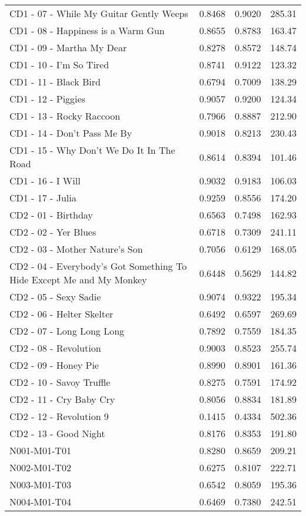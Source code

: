 \begin{longtable}[c]{|l|c|l|l|}
CD1 - 07 - While My Guitar Gently Weeps & 0.8468 & 0.9020 & 285.31 \\
CD1 - 08 - Happiness is a Warm Gun & 0.8655 & 0.8783 & 163.47 \\
CD1 - 09 - Martha My Dear & 0.8278 & 0.8572 & 148.74 \\
CD1 - 10 - I'm So Tired & 0.8741 & 0.9122 & 123.32 \\
CD1 - 11 - Black Bird & 0.6794 & 0.7009 & 138.29 \\
CD1 - 12 - Piggies & 0.9057 & 0.9200 & 124.34 \\
CD1 - 13 - Rocky Raccoon & 0.7966 & 0.8887 & 212.90 \\
CD1 - 14 - Don't Pass Me By & 0.9018 & 0.8213 & 230.43 \\
CD1 - 15 - Why Don't We Do It In The Road & 0.8614 & 0.8394 & 101.46 \\
CD1 - 16 - I Will & 0.9032 & 0.9183 & 106.03 \\
CD1 - 17 - Julia & 0.9259 & 0.8556 & 174.20 \\
CD2 - 01 - Birthday & 0.6563 & 0.7498 & 162.93 \\
CD2 - 02 - Yer Blues & 0.6718 & 0.7309 & 241.11 \\
CD2 - 03 - Mother Nature's Son & 0.7056 & 0.6129 & 168.05 \\
CD2 - 04 - Everybody's Got Something To Hide Except Me and My Monkey & 0.6448 & 0.5629 & 144.82 \\
CD2 - 05 - Sexy Sadie & 0.9074 & 0.9322 & 195.34 \\
CD2 - 06 - Helter Skelter & 0.6492 & 0.6597 & 269.69 \\
CD2 - 07 - Long Long Long & 0.7892 & 0.7559 & 184.35 \\
CD2 - 08 - Revolution & 0.9003 & 0.8523 & 255.74 \\
CD2 - 09 - Honey Pie & 0.8990 & 0.8901 & 161.36 \\
CD2 - 10 - Savoy Truffle & 0.8275 & 0.7591 & 174.92 \\
CD2 - 11 - Cry Baby Cry & 0.8056 & 0.8834 & 181.89 \\
CD2 - 12 - Revolution 9 & 0.1415 & 0.4334 & 502.36 \\
CD2 - 13 - Good Night & 0.8176 & 0.8353 & 191.80 \\
N001-M01-T01 & 0.8280 & 0.8659 & 209.21 \\
N002-M01-T02 & 0.6275 & 0.8107 & 222.71 \\
N003-M01-T03 & 0.6542 & 0.8059 & 195.36 \\
N004-M01-T04 & 0.6469 & 0.7380 & 242.51 \\

\end{longtable}
